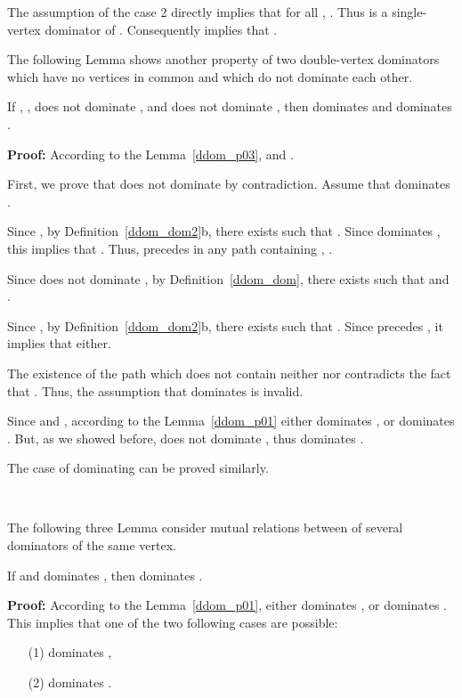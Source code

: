 \documentclass{llncs}
\begin{document}
The assumption of the case 2 directly implies that for all , . Thus  is a single-vertex
dominator of . Consequently  implies that
.
\begin{flushright}

\end{flushright}

The following Lemma shows another property of two double-vertex dominators
which have no vertices in common and which do not dominate each other.

\begin{lemma} \label{ddom_p04}
If , ,
 does not dominate , and  does not
dominate , then  dominates  and 
dominates .

\end{lemma}
{\bf Proof:} According to the Lemma~\ref{ddom_p03}, 
and .

First, we prove that  does not dominate  by contradiction.
Assume that  dominates .

Since , by Definition~\ref{ddom_dom2}b, there exists
 such that . Since
 dominates , this implies that . Thus,
 precedes  in any path containing , .

Since  does not dominate , by Definition~\ref{ddom_dom},
there exists  such that  and
.

Since , by Definition~\ref{ddom_dom2}b, there exists
 such that . Since 
precedes , it implies that  either.

The existence of the path  which does not contain neither 
nor  contradicts the fact that . Thus,
the assumption that  dominates  is invalid.

Since  and , according
to the Lemma~\ref{ddom_p01} either  dominates , or
 dominates . But, as we showed before, 
does not dominate , thus  dominates .

The case of  dominating  can be proved similarly.
\begin{flushright}
 \\
\end{flushright}

The following three Lemma consider mutual relations between of several dominators of the same vertex.

\begin{lemma} \label{ddom_p015}
If  and
 dominates , then  dominates .
\end{lemma}
{\bf Proof:} According to the Lemma~\ref{ddom_p01}, either 
dominates , or  dominates . This implies that one of the
two following cases are possible:
\begin{itemize}
\item[(1)]  dominates ,
\item[(2)]  dominates .
\end{itemize}
\end{document}
